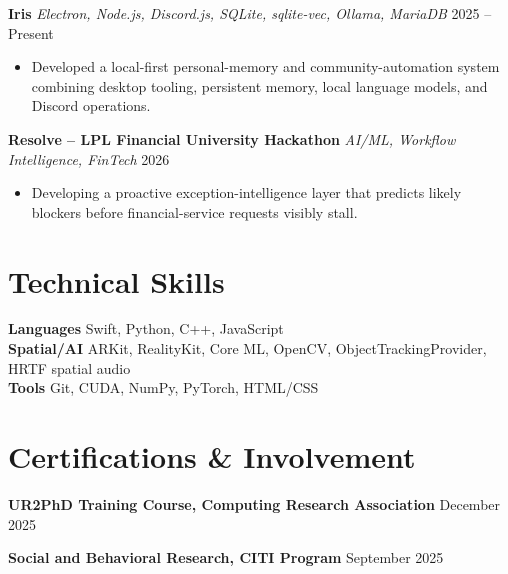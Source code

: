 \documentclass[letterpaper,10pt]{article}
\newcommand{\projectentry}[3]{
  \noindent\textbf{#1} \textbar{} \textit{#2} \hfill #3
}
\newcommand{\activityentry}[2]{
  \noindent\textbf{#1} \hfill #2
}
\begin{document}
\smallskip

\projectentry
  {Iris}
  {Electron, Node.js, Discord.js, SQLite, sqlite-vec, Ollama, MariaDB}
  {2025 -- Present}
\begin{itemize}
  \item Developed a local-first personal-memory and community-automation system combining desktop tooling, persistent memory, local language models, and Discord operations.
\end{itemize}

\smallskip

\projectentry
  {Resolve -- LPL Financial University Hackathon}
  {AI/ML, Workflow Intelligence, FinTech}
  {2026}
\begin{itemize}
  \item Developing a proactive exception-intelligence layer that predicts likely blockers before financial-service requests visibly stall.
\end{itemize}

\section{Technical Skills}

\noindent\textbf{Languages} \quad Swift, Python, C++, JavaScript \\[1pt]
\noindent\textbf{Spatial/AI} \quad ARKit, RealityKit, Core ML, OpenCV, ObjectTrackingProvider, HRTF spatial audio \\[1pt]
\noindent\textbf{Tools} \quad Git, CUDA, NumPy, PyTorch, HTML/CSS

\section{Certifications \& Involvement}

\activityentry
  {UR2PhD Training Course, Computing Research Association}{December 2025}

\smallskip

\activityentry
  {Social and Behavioral Research, CITI Program}{September 2025}
\end{document}
